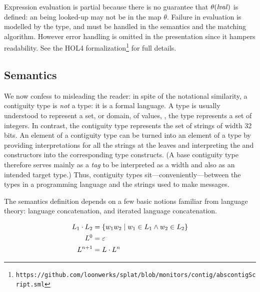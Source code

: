 \begin{remark}[Partiality]
Expression evaluation is partial because there is no guarantee that
$\theta(\mathit{lval})$ is defined: an \lval{} being looked-up may not be in the
map $\theta$. Failure in evaluation is modelled by the 
type, and must be handled in the semantics and the matching
algorithm. However error handling is omitted in the presentation since
it hampers readability. See the HOL4 formalization\footnote{
\texttt{https://github.com/loonwerks/splat/blob/monitors/contig/abscontigScript.sml}}
for full details.
\end{remark}

\subsection{Semantics}

 We now confess to misleading the reader: in spite of the notational
 similarity, a contiguity type is \emph{not} a type: it is a formal
 language. A type is usually understood to represent a set, or domain,
 of values, \eg, the type  represents a set of
 integers. In contrast, the contiguity type  represents the
 set of strings of width 32 bits. An element of a contiguity type can
 be turned into an element of a type by providing interpretations for
 all the strings at the leaves and interpreting the  and
  constructors into the corresponding type constructs. (A
 base contiguity type therefore serves mainly as a \emph{tag} to be
 interpreted as a width and also as an intended target type.) Thus,
 contiguity types sit---conveniently---between the types in a
 programming language and the strings used to make messages.

The semantics definition depends on a few basic notions familiar from
language theory: language concatenation, and iterated language
concatenation.

\begin{align*}
L_1 \cdot L_2 &= \{ {w_1 w_2 \mid w_1 \in L_1 \land w_2 \in  L_2} \} \\
L^0 &= \varepsilon \\
L^{n+1} &= L \cdot L^n
\end{align*}


